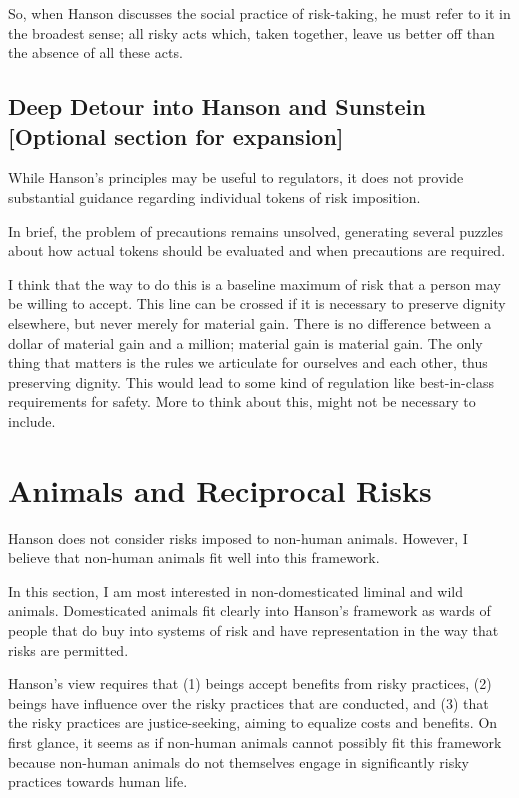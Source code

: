 So, when Hanson discusses the social practice of risk-taking, he must refer to
it in the broadest sense; all risky acts which, taken together, leave us better
off than the absence of all these acts.
 
\subsection{Deep Detour into Hanson and Sunstein [Optional section for
expansion]} While Hanson’s principles may be useful to regulators, it does not
provide substantial guidance regarding individual tokens of risk imposition.

In brief, the problem of precautions remains unsolved, generating several
puzzles about how actual tokens should be evaluated and when precautions are
required.

I think that the way to do this is a baseline maximum of risk that a person may
be willing to accept. This line can be crossed if it is necessary to preserve
dignity elsewhere, but never merely for material gain. There is no difference
between a dollar of material gain and a million; material gain is material
gain.  The only thing that matters is the rules we articulate for ourselves and
each other, thus preserving dignity. This would lead to some kind of regulation
like best-in-class requirements for safety. More to think about this, might not
be necessary to include.

\section{Animals and Reciprocal Risks}

Hanson does not consider risks imposed to non-human animals. However, I believe
that non-human animals fit well into this framework.

In this section, I am most interested in non-domesticated liminal and wild
animals. Domesticated animals fit clearly into Hanson’s framework as wards of
people that do buy into systems of risk and have representation in the way that
risks are permitted.

Hanson’s view requires that (1) beings accept benefits from risky practices,
(2) beings have influence over the risky practices that are conducted, and (3)
that the risky practices are justice-seeking, aiming to equalize costs and
benefits.  On first glance, it seems as if non-human animals cannot possibly
fit this framework because non-human animals do not themselves engage in
significantly risky practices towards human life.

